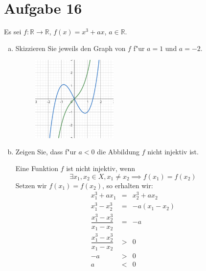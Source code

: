 \section{Aufgabe 16}
\setcounter{section}{16}

Es sei $f : \mathbb{R} \rightarrow \mathbb{R}$, $f(x) = x^3 + ax$, $a \in \mathbb{R}$.

\begin{enumerate}[(a)]
    \item Skizzieren Sie jeweils den Graph von $f$ f"ur $a = 1$ und $a = -2$.
        \begin{figure}[h]
            \centering
            \includegraphics[width=0.40\textwidth]{./assets/abbildung-16-01.png}
            \caption{}
        \end{figure}

    \item Zeigen Sie, dass f"ur $a < 0$ die Abbildung $f$ nicht injektiv ist.

        Eine Funktion $f$ ist nicht injektiv, wenn
        \begin{equation*}
            \exists x_1, x_2 \in X, x_1 \neq x_2 \implies f(x_1) = f(x_2)
        \end{equation*}
        Setzen wir $f(x_1) = f(x_2)$, so erhalten wir:
        \begin{equation*}
            \begin{array}{rcl}
                x_1^3 + ax_1 &=& x_2^3 + ax_2 \\[5pt]
                x_1^3 - x_2^3 &=& -a(x_1 - x_2)  \\[10pt]
                \dfrac{x_1^3 - x_2^3}{x_1 - x_2} &=& -a \\[15pt]
                \dfrac{x_1^3 - x_2^3}{x_1 - x_2} &>& 0 \\[15pt]
                -a &>& 0 \\[5pt]
                 a &<& 0
            \end{array}
        \end{equation*}
\end{enumerate}
